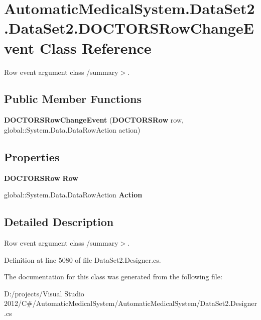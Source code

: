 \section{AutomaticMedicalSystem.DataSet2.DataSet2.DOCTORSRowChangeEvent Class Reference}
\label{class_automatic_medical_system_1_1_data_set2_1_1_d_o_c_t_o_r_s_row_change_event}
Row event argument class /summary$>$.  


\subsection*{Public Member Functions}
\begin{CompactItemize}
\item 
\textbf{DOCTORSRowChangeEvent} ({\bf DOCTORSRow} row, global::System.Data.DataRowAction action)\label{class_automatic_medical_system_1_1_data_set2_1_1_d_o_c_t_o_r_s_row_change_event_e97e6d26e247ecaf85545d95452f88e1}

\end{CompactItemize}
\subsection*{Properties}
\begin{CompactItemize}
\item 
{\bf DOCTORSRow} \textbf{Row}\hspace{0.3cm}{\tt  [get]}\label{class_automatic_medical_system_1_1_data_set2_1_1_d_o_c_t_o_r_s_row_change_event_a7292fa881fae2bfb2d78ed8fd4169f7}

\item 
global::System.Data.DataRowAction \textbf{Action}\hspace{0.3cm}{\tt  [get]}\label{class_automatic_medical_system_1_1_data_set2_1_1_d_o_c_t_o_r_s_row_change_event_54eadb8341d89ca661421c115a591965}

\end{CompactItemize}


\subsection{Detailed Description}
Row event argument class /summary$>$. 

Definition at line 5080 of file DataSet2.Designer.cs.

The documentation for this class was generated from the following file:\begin{CompactItemize}
\item 
D:/projects/Visual Studio 2012/C\#/AutomaticMedicalSystem/AutomaticMedicalSystem/DataSet2.Designer.cs\end{CompactItemize}
